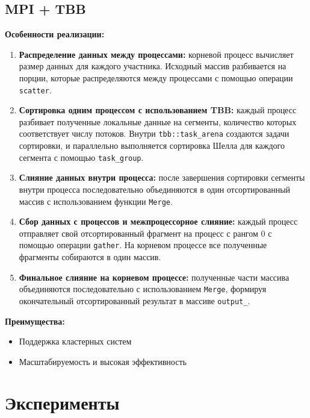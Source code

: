 \documentclass[a4paper,12pt]{article}
\begin{document}
\newpage

\subsection*{MPI + TBB}

\textbf{Особенности реализации:}
\begin{enumerate}
  \item \textbf{Распределение данных между процессами:} корневой процесс вычисляет размер данных для каждого участника. Исходный массив разбивается на порции, которые распределяются между процессами с помощью операции \texttt{scatter}.
  
  \item \textbf{Сортировка одним процессом с использованием TBB:} каждый процесс разбивает полученные локальные данные на сегменты, количество которых соответствует числу потоков. Внутри \texttt{tbb::task\_arena} создаются задачи сортировки, и параллельно выполняется сортировка Шелла для каждого сегмента с помощью \texttt{task\_group}.
  
  \item \textbf{Слияние данных внутри процесса:} после завершения сортировки сегменты внутри процесса последовательно объединяются в один отсортированный массив с использованием функции \texttt{Merge}.
  
  \item \textbf{Сбор данных с процессов и межпроцессорное слияние:} каждый процесс отправляет свой отсортированный фрагмент на процесс с рангом 0 с помощью операции \texttt{gather}. На корневом процессе все полученные фрагменты собираются в один массив.
  
  \item \textbf{Финальное слияние на корневом процессе:} полученные части массива объединяются последовательно с использованием \texttt{Merge}, формируя окончательный отсортированный результат в массиве \texttt{output\_}.
\end{enumerate}


\textbf{Преимущества:}
\begin{itemize}
  \item Поддержка кластерных систем
  \item Масштабируемость и высокая эффективность
\end{itemize}

\newpage

\section{Эксперименты}
\end{document}
